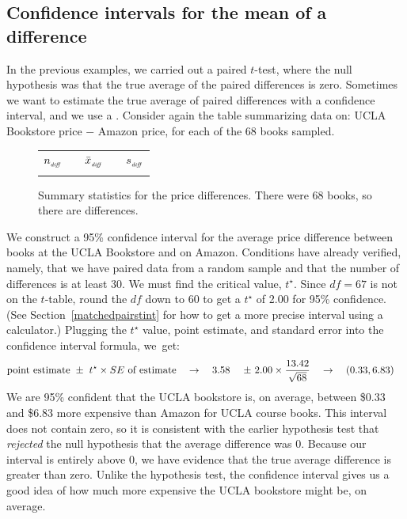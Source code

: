 \D{~}


\subsection{Confidence intervals for the mean of a difference}
\label{ciMeanOfDifferences}

In the previous examples, we carried out a paired $t$-test, where the null hypothesis was that the true average of the paired differences is zero. Sometimes we want to estimate the true average of paired differences with a confidence interval, and we use a . Consider again the table summarizing data on: UCLA Bookstore price $-$ Amazon price, for each of the 68 books sampled.

\begin{figure}[hh]
\centering
\begin{tabular}{ccccc}
\hline
$n_{_{\text{\emph{diff}}}}$	&\hspace{3mm}& $\bar{x}_{_{\text{\emph{diff}}}}$	&\hspace{3mm}& $s_{_{\text{\emph{diff}}}}$ \vspace{1mm}\\
\uclabookN{}  && \uclabookM{}  && \uclabookSD{} \\
\hline
\end{tabular}
\caption{Summary statistics for the price differences.
    There were 68 books, so there are \uclabookN{}
    differences.}
\label{textbooksSummaryStats1}
\end{figure}

We construct a 95\% confidence interval for the average price difference between books at the UCLA Bookstore and on Amazon. Conditions have already verified, namely, that we have paired data from a random sample and that the number of differences is at least 30.  We must find the critical value, $t^{\star}$. Since $df = 67$ is not on the $t$-table, round the $df$ down to 60 to get a $t^{\star}$ of 2.00 for 95\% confidence. (See Section~\ref{matchedpairstint} for how to get a more precise interval using a calculator.)  Plugging the $t^{\star}$ value, point estimate, and standard error into the confidence interval formula, we~get:
\begin{align*}
\text{point estimate} \ &\pm\ t^{\star}\times SE\ \text{of estimate}
  \quad\to\quad
      \uclabookM{} \ &\pm\ 
          2.00 \times
          \frac{\uclabookSD{}}{\sqrt{\uclabookN{}}}
  \quad\to\quad
      (0.33&,  6.83)
\end{align*}
We are 95\% confident that the UCLA bookstore is, on average, between \$0.33 and \$6.83 more expensive than Amazon for UCLA course books. This interval does not contain zero, so it is consistent with the earlier hypothesis test that \emph{rejected} the null hypothesis that the average difference was 0. Because our interval is entirely above 0, we have evidence that the true average difference is greater than zero. Unlike the hypothesis test, the confidence interval gives us a good idea of how much more expensive the UCLA bookstore might be, on average.


